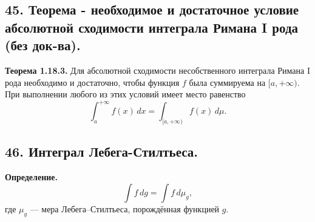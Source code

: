 \documentclass[12pt]{article}
\begin{document}
\subsection*{45. Теорема - необходимое и достаточное условие абсолютной сходимости интеграла
Римана I рода (без док-ва).}
\textbf{Теорема 1.18.3.} Для абсолютной сходимости несобственного интеграла Римана I рода необходимо и достаточно, чтобы функция $f$ была суммируема на $[a,+\infty)$. При выполнении любого из этих условий имеет место равенство \[ \int_a^{+\infty} f(x)\,dx = \int_{[a,+\infty)} f(x)\,d\mu. \]

\subsection*{46. Интеграл Лебега-Стилтьеса.}
\textbf{Определение.} \[ \int f\,dg = \int f\,d\mu_g, \] где $\mu_g$ — мера Лебега–Стилтьеса, порождённая функцией $g$.
\end{document}
